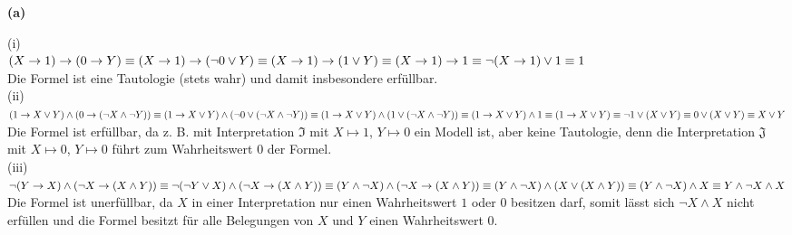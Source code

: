 \documentclass[11pt, a4paper]{article}
\newcommand{\interpretation}[1] {\mathfrak{#1}}
\begin{document}
\textbf{(a)}
\begin{adjustwidth}{20pt}{20pt}
(i)\\
 $(X\rightarrow 1)\rightarrow(0\rightarrow Y)\\ \equiv (X\rightarrow 1)\rightarrow(\neg 0\vee Y)\\ \equiv (X\rightarrow 1)\rightarrow(1 \vee Y)\\ \equiv (X\rightarrow 1)\rightarrow 1\\ \equiv \neg (X \rightarrow 1) \vee 1\equiv 1$\\

Die Formel ist eine Tautologie (stets wahr) und damit insbesondere erfüllbar.\\
(ii)\\
 $(1 \rightarrow X \vee Y) \wedge (0 \rightarrow (\neg X \wedge \neg Y))\\ \equiv (1 \rightarrow X \vee Y) \wedge (\neg 0 \vee (\neg X \wedge \neg Y))\\ \equiv (1 \rightarrow X \vee Y) \wedge (1 \vee (\neg X \wedge \neg Y))\\ \equiv (1 \rightarrow X \vee Y) \wedge 1 \equiv (1 \rightarrow X \vee Y)\\ \equiv \neg 1 \vee (X \vee Y) \equiv 0 \vee (X \vee Y) \equiv X \vee Y$\\

Die Formel ist erfüllbar, da z. B. mit Interpretation $\interpretation{I}$ mit $X\mapsto 1$, $Y\mapsto 0$ ein Modell ist, aber keine Tautologie, denn die Interpretation $\interpretation{J}$ mit $X\mapsto 0$, $Y\mapsto 0$ führt zum Wahrheitswert $0$ der Formel.\\
(iii)\\
 $\neg (Y \rightarrow X)\wedge(\neg X \rightarrow (X \wedge Y))\\ \equiv \neg (\neg Y \vee X)\wedge(\neg X \rightarrow (X \wedge Y))\\ \equiv ( Y \wedge \neg X)\wedge(\neg X \rightarrow (X \wedge Y))\\ \equiv ( Y \wedge \neg X)\wedge( X \vee (X \wedge Y))\\ \equiv ( Y \wedge \neg X)\wedge X \equiv Y \wedge \neg X \wedge X$\\

Die Formel ist unerfüllbar, da $X$ in einer Interpretation nur einen Wahrheitswert $1$ oder $0$ besitzen darf, somit lässt sich $\neg X \wedge X$ nicht erfüllen und die Formel besitzt für alle Belegungen von $X$ und $Y$ einen Wahrheitswert $0$.

\end{adjustwidth}
\end{document}
